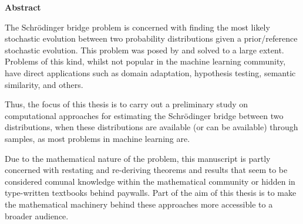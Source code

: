 \newpage
{\Huge \bf Abstract}
\vspace{24pt} 


The Schrödinger bridge problem is concerned with finding the most likely stochastic evolution between two probability distributions given a prior/reference stochastic evolution. This problem was posed by \cite{schrodinger1931uber,schrodinger1932theorie} and solved to a large extent. Problems of this kind, whilst not popular in the machine learning community, have direct applications such as domain adaptation, hypothesis testing, semantic similarity, and others.

Thus, the focus of this thesis is to carry out a preliminary study on computational approaches for estimating the Schrödinger bridge between two distributions, when these distributions are available (or can be available) through samples, as most problems in machine learning are.

Due to the mathematical nature of the problem, this manuscript is partly concerned with restating and re-deriving theorems and results that seem to be considered comunal knowledge within the mathematical community or hidden in type-written textbooks behind paywalls. Part of the aim of this thesis is to make the mathematical machinery behind these approaches more accessible to a broader audience.

\newpage
\vspace*{\fill}
